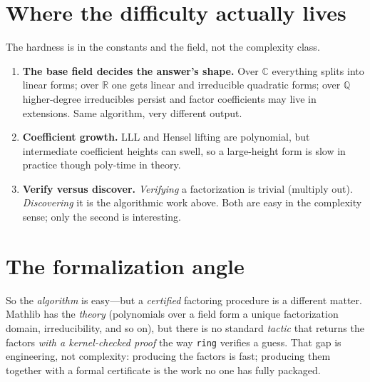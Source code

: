 \documentclass[11pt]{article}
\begin{document}
\section*{Where the difficulty actually lives}

The hardness is in the constants and the field, not the complexity class.
\begin{enumerate}
  \item \textbf{The base field decides the answer's shape.} Over $\mathbb{C}$
    everything splits into linear forms; over $\mathbb{R}$ one gets linear and
    irreducible quadratic forms; over $\mathbb{Q}$ higher-degree irreducibles
    persist and factor coefficients may live in extensions. Same algorithm, very
    different output.
  \item \textbf{Coefficient growth.} LLL and Hensel lifting are polynomial, but
    intermediate coefficient heights can swell, so a large-height form is slow in
    practice though poly-time in theory.
  \item \textbf{Verify versus discover.} \emph{Verifying} a factorization is
    trivial (multiply out). \emph{Discovering} it is the algorithmic work above.
    Both are easy in the complexity sense; only the second is interesting.
\end{enumerate}

\section*{The formalization angle}

So the \emph{algorithm} is easy---but a \emph{certified} factoring procedure is a
different matter. Mathlib has the \emph{theory} (polynomials over a field form a
unique factorization domain, irreducibility, and so on), but there is no standard
\emph{tactic} that returns the factors \emph{with a kernel-checked proof} the way
\texttt{ring} verifies a guess. That gap is engineering, not complexity:
producing the factors is fast; producing them together with a formal certificate
is the work no one has fully packaged.
\end{document}
